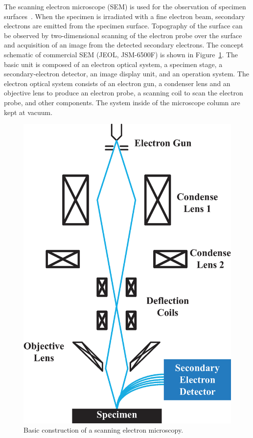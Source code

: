 The scanning electron microscope (SEM) is used for the observation of specimen surfaces~\cite{von1938elektronen}. When the specimen is irradiated with a fine electron beam, secondary electrons are emitted from the specimen surface. Topography of the surface can be observed by two-dimensional scanning of the electron probe over the surface and acquisition of an image from the detected secondary electrons. The concept schematic of commercial SEM (JEOL, JSM-6500F) is shown in Figure~\ref{fig:sem1}. The basic unit is composed of an electron optical system, a specimen stage, a secondary-electron detector, an image display unit, and an operation system. The electron optical system consists of an electron gun, a condenser lens and an objective lens to produce an electron probe, a scanning coil to scan the electron probe, and other components. The system inside of the microscope column are kept at vacuum.
\begin{figure}[htb]
\centering
\includegraphics[scale=0.5]{figures/SEM.eps}
\caption{\label{fig:sem1}Basic construction of a scanning electron microscopy.}
\end{figure}



